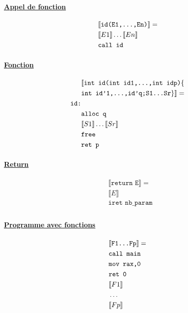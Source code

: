 \documentclass[12pt,twocolumn]{report}
\begin{document}
\begin{trad}
    \paragraph*{ \underline{Appel de fonction}}
    \begin{align*}
        &\llbracket \texttt{id(E1,\dots,En)} \rrbracket = \\
        &\llbracket E1 \rrbracket \dots \llbracket En \rrbracket\\
        &\texttt{call id}\\
    \end{align*}
\end{trad}
\begin{trad}
    \paragraph*{ \underline{Fonction}}
    \begin{align*}
        &\llbracket \texttt{int id(int id1,\dots,int idp)}\lbrace \\
        &\texttt{int id'1,\dots,id'q;S1\dots Sr} \rbrace \rrbracket =\\
        \texttt{id:}&\\
        &\texttt{alloc q}\\
        &\llbracket S1 \rrbracket \dots \llbracket Sr \rrbracket\\
        &\texttt{free}\\
        &\texttt{ret p}
    \end{align*}
\end{trad}
\begin{trad}
    \paragraph*{ \underline{Return}}
    \begin{align*}
        &\llbracket \texttt{return E} \rrbracket = \\
        &\llbracket E \rrbracket\\
        &\texttt{iret nb\_param}\\
    \end{align*}
\end{trad}
\begin{trad}
    \paragraph*{ \underline{Programme avec fonctions}}
    \begin{align*}
        &\llbracket \texttt{F1\dots Fp} \rrbracket = \\
        &\texttt{call main}\\
        &\texttt{mov rax,0}\\
        &\texttt{ret 0}\\
        &\llbracket F1 \rrbracket\\
        & \dots\\
        &\llbracket Fp \rrbracket\\
    \end{align*}
\end{trad}
\end{document}
